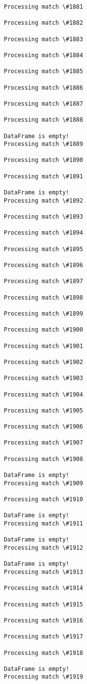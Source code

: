 \documentclass[11pt]{article}
\begin{document}
\begin{Verbatim}[commandchars=\\\{\}]
Processing match \#1881

Processing match \#1882

Processing match \#1883

Processing match \#1884

Processing match \#1885

Processing match \#1886

Processing match \#1887

Processing match \#1888

DataFrame is empty!
Processing match \#1889

Processing match \#1890

Processing match \#1891

DataFrame is empty!
Processing match \#1892

Processing match \#1893

Processing match \#1894

Processing match \#1895

Processing match \#1896

Processing match \#1897

Processing match \#1898

Processing match \#1899

Processing match \#1900

Processing match \#1901

Processing match \#1902

Processing match \#1903

Processing match \#1904

Processing match \#1905

Processing match \#1906

Processing match \#1907

Processing match \#1908

DataFrame is empty!
Processing match \#1909

Processing match \#1910

DataFrame is empty!
Processing match \#1911

DataFrame is empty!
Processing match \#1912

DataFrame is empty!
Processing match \#1913

Processing match \#1914

Processing match \#1915

Processing match \#1916

Processing match \#1917

Processing match \#1918

DataFrame is empty!
Processing match \#1919


\end{Verbatim}
\end{document}
